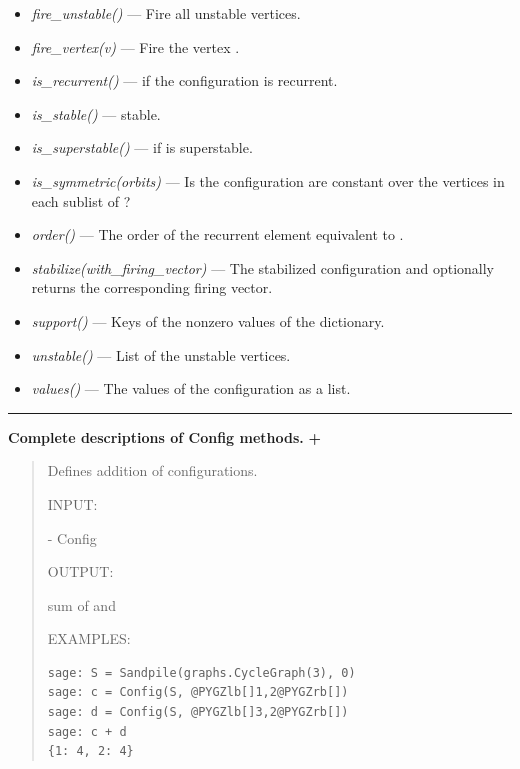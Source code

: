 \documentclass[letterpaper,10pt,english]{manual}
\begin{document}
\begin{itemize}
\item {} 
\emph{fire\_unstable()} --- Fire all unstable vertices.

\item {} 
\emph{fire\_vertex(v)} --- Fire the vertex .

\item {} 
\emph{is\_recurrent()} ---  if the configuration is recurrent.

\item {} 
\emph{is\_stable()} ---  stable.

\item {} 
\emph{is\_superstable()} ---  if  is
superstable.

\item {} 
\emph{is\_symmetric(orbits)} --- Is the configuration are constant over the vertices in each sublist of ?

\item {} 
\emph{order()} --- The order of the recurrent element equivalent to .

\item {} 
\emph{stabilize(with\_firing\_vector)} --- The stabilized configuration and optionally returns the corresponding firing vector.

\item {} 
\emph{support()} --- Keys of the nonzero values of the dictionary.

\item {} 
\emph{unstable()} --- List of the unstable vertices.

\item {} 
\emph{values()} --- The values of the configuration as a list.

\end{itemize}


\bigskip\hrule{}\bigskip


\textbf{Complete descriptions of Config methods.}
\hypertarget{id8}{}
\textbf{+}
\begin{quote}

Defines addition of configurations.

INPUT:

 - Config

OUTPUT:

sum of  and 

EXAMPLES:

\begin{Verbatim}[commandchars=@\[\]]
sage: S = Sandpile(graphs.CycleGraph(3), 0)
sage: c = Config(S, @PYGZlb[]1,2@PYGZrb[])
sage: d = Config(S, @PYGZlb[]3,2@PYGZrb[])
sage: c + d
{1: 4, 2: 4}
\end{Verbatim}
\end{quote}
\end{document}
